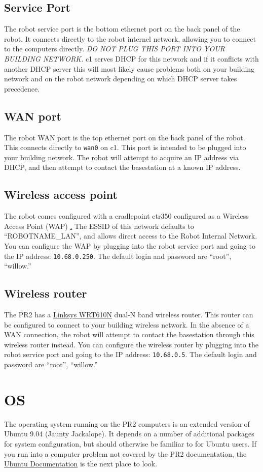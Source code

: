 \subsection{Service Port} The robot service port is the bottom
ethernet port on the back panel of the robot.  It connects directly to
the robot internel network, allowing you to connect to the computers
directly.  \textit{DO NOT PLUG THIS PORT INTO YOUR BUILDING NETWORK.}
c1 serves DHCP for this network and if it conflicts with another DHCP
server this will most likely cause problems both on your building
network and on the robot network depending on which DHCP server takes
precedence.
\subsection{WAN port} The robot WAN port is the top ethernet port on
the back panel of the robot.  This connects directly to \texttt{wan0}
on c1.  This port is intended to be plugged into your building
network.  The robot will attempt to acquire an IP address via DHCP,
and then attempt to contact the basestation at a known IP address.
\subsection{Wireless access point} The robot comes configured with a
cradlepoint ctr350 configured as a Wireless Access Point (WAP)
\href{http://www.cradlepoint.com/products/ctr350-mobile-broadband-router}.
The ESSID of this network defaults to ``\<ROBOTNAME\>_LAN'', and allows
direct access to the Robot Internal Network.  You can configure the
WAP by plugging into the robot service port and going to the IP
address: \texttt{10.68.0.250}.  The default login and password are
``root'', ``willow.''

\subsection{Wireless router}
The PR2 has a
\href{http://www.linksysbycisco.com/US/en/products/WRT610N}{Linksys
  WRT610N} dual-N band wireless router.  This router can be configured
to connect to your building wireless network.  In the absence of a WAN
connection, the robot will attempt to contact the basestation through
this wireless router instead. You can configure the wireless router by
plugging into the robot service port and going to the IP address:
\texttt{10.68.0.5}.  The default login and password are ``root'',
``willow.''

\section{OS}
The operating system running on the PR2 computers is an extended
version of Ubuntu 9.04 (Jaunty Jackalope). It depends on a number of
additional packages for system configuration, but should otherwise be
familiar to for Ubuntu users. If you run into a computer problem not
covered by the PR2 documentation, the
\href{https://help.ubuntu.com/9.04/index.html}{Ubuntu Documentation}
is the next place to look.

